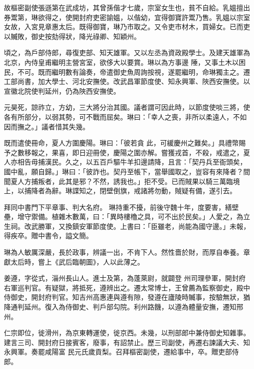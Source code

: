\begin{pinyinscope}
 故樞密副使張遜第在武成坊，其曾孫偕才七歲，宗室女生也，貧不自給。乳媼擅出券鬻第，琳欲得之，使開封府吏密諭媼，以偕幼，宜得御寶許鬻乃售。乳媼以宗室女故，入宮見章惠太后。既得御寶，琳乃市取之。又令吏市材木，買婦女。已而吏以贓敗，御史按劾得狀，降光祿卿、知穎州。



 頃之，為戶部侍郎，尋復吏部、知天雄軍。又以左丞為資政殿學士。及建天雄軍為北京，內侍皇甫繼明主營宮室，欲侈大以要賞。琳以為方事邊
 陲，又事土木以困民，不可。既而繼明數有論奏，帝遣御史魚周詢按視，遂罷繼明，命琳獨主之。遷工部尚書，加大學士、河北安撫使。改武昌軍節度使、知永興軍、陜西安撫使。以宣徽北院使判延州，仍為陜西安撫使。



 元昊死，諒祚立，方幼，三大將分治其國。議者謂可因此時，以節度使啖三將，使各有所部分，以弱其勢，可不戰而屈矣。琳曰：「幸人之喪，非所以柔遠人，不如因而撫之。」議者惜其失幾。



 既而遣使冊命，夏人方圍慶陽。琳曰：「彼若貪
 此，可緩慶州之難矣。」具禮幣賜予之數移報之，果喜，即日迎冊使，慶陽之圍亦解。嘗獲戎首，不殺，戒遣之，夏人亦相告毋捕漢民。久之，以五百戶驅牛羊扣邊請降，且言：「契丹兵至衙頭矣，國中亂，願自歸。」琳曰：「彼詐也。契丹至帳下，當舉國取之，豈容有來降者？間聞夏人方捕叛者，此其是邪？不然，誘我也。」拒不受。已而賊果以騎三萬臨境上，以捕降者為辭。琳諜知之，閉壁倒旗，戒諸將勿動，賊疑有備，遂引去。



 拜同中書門下平章事、判大名府。
 琳持重不擾，前後守魏十年，度要害，繕壁壘，增守禦備。植雜木數萬，曰：「異時樓櫓之具，可不出於民矣。」人愛之，為立生祠。改武勝軍，又換鎮安軍節度使。上書曰：「臣雖老，尚能為國守邊。」未報，得疾卒。贈中書令，謚文簡。



 琳為人敏厲深嚴，長於政事，辨議一出，不肯下人。然性嗇於財，而厚自奉養。章獻太后時，嘗上《武后臨朝圖》，人以此薄之。



 姜遵，字從式，淄州長山人。進士及第，為蓬萊尉，就闢登
 州司理參軍，開封府右軍巡判官。有疑獄，將抵死，遵辨出之。遷太常博士，王曾薦為監察御史，殿中侍御史，開封府判官。知吉州高惠連與遵有隙，發遵在廬陵時贓事，按驗無狀，猶降通判延州。復入為侍御史、判戶部勾院。利州路饑，以遵為體量安撫，遷知邢州。



 仁宗即位，徙滑州，為京東轉運使，徙京西。未幾，以刑部郎中兼侍御史知雜事。建言三司、開封府日接賓客，廢事，有詔禁止。歷三司副使，再遷右諫議大夫、知永興軍。奏罷咸陽富
 民元氏歲貢梨。召拜樞密副使，遷給事中，卒。贈吏部侍郎。




\end{pinyinscope}
